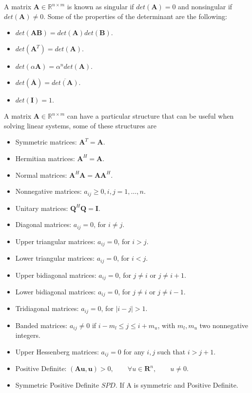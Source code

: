 \documentclass[12pt]{report}
\begin{document}
A matrix $\mathbf{A}\in \mathbb{R}^{n\times m}$ is known as singular if $det(\mathbf{A})=0$ and nonsingular if $det(\mathbf{A})\neq 0$.
Some of the properties of the determinant are the following:
\begin{itemize}
\item $det(\mathbf{A}\mathbf{B})=det(\mathbf{A})det(\mathbf{B}).$
\item $det(\mathbf{A}^T)=det(\mathbf{A}).$
\item $det(\alpha \mathbf{A})=\alpha^ndet(\mathbf{A}).$
\item $det(\overline{\mathbf{A}})=\overline{det(\mathbf{A})}.$
\item $det(\mathbf{I})=1.$
\end{itemize}
A matrix $\mathbf{A}\in \mathbb{R}^{n\times m}$ can have a particular structure that can be useful when solving linear systems, some of these structures are
\begin{itemize}
\item Symmetric matrices: $\mathbf{A}^T=\mathbf{A}.$
\item Hermitian matrices: $\mathbf{A}^H=\mathbf{A}.$
\item Normal matrices: $\mathbf{A}^H\mathbf{A}=\mathbf{A}\mathbf{A}^H.$
\item Nonnegative matrices: $a_{ij}\geq0, i,j=1,\dots,n.$
\item Unitary matrices: $\mathbf{Q}^H\mathbf{Q}=\mathbf{I}.$
\item Diagonal matrices: $a_{ij}=0$, for $i\neq j.$
\item Upper triangular matrices: $a_{ij}=0$, for $i>j.$
\item Lower triangular matrices: $a_{ij}=0$, for $i<j.$
\item Upper bidiagonal matrices: $a_{ij}=0$, for $j\neq i$ or $j\neq i+1.$
\item Lower bidiagonal matrices: $a_{ij}=0$, for $j\neq i$ or $j \neq i-1.$
\item Tridiagonal matrices: $a_{ij}=0$, for $|i-j|>1.$
\item Banded matrices: $a_{ij}\neq 0$ if $i-m_l\leq j \leq i+m_u$, with $m_l,m_u$ two nonnegative integers.
\item Upper Hessenberg matrices: $a_{ij}=0$ for any $i,j$ such that $i>j+1$.
\item Positive Definite: $(\mathbf{A}\mathbf{u},\mathbf{u})>0, \qquad \forall u \in \mathbf{R}^n, \qquad u\neq0.$
\item Symmetric Positive Definite $SPD$. If A is symmetric and Positive Definite.
\end{itemize}
\end{document}
